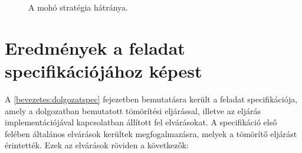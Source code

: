 \documentclass[oneside,titlepage,12pt,a4paper]{report}
\begin{document}
\begin{figure}[htb!]
\caption{A mohó stratégia hátránya.}
\label{fig:counterexample}
\end{figure}	

\section{Eredmények a feladat specifikációjához képest}

A \ref{bevezetes:dolgozatspec} fejezetben bemutatásra került a feladat specifikációja, amely a dolgozatban bemutatott tömörítési eljárással, illetve az eljárás implementációjával kapcsolatban állított fel elvárásokat. A specifikáció első felében általános elvárások kerültek megfogalmazásra, melyek a tömörítő eljárást érintették. Ezek az elvárások röviden a következők: 
\end{document}
